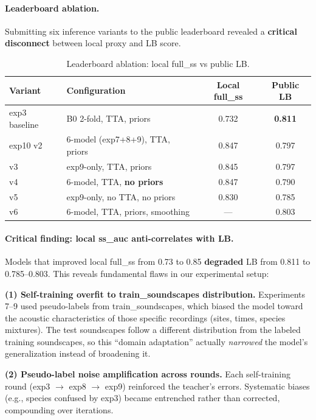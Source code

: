 \paragraph{Leaderboard ablation.}
Submitting six inference variants to the public leaderboard revealed a
\textbf{critical disconnect} between local proxy and LB score.

\begin{table}[h]
\centering
\caption{Leaderboard ablation: local full\_ss vs public LB.}
\label{tab:lb-ablation}
\begin{tabular}{llcc}
\hline
\textbf{Variant} & \textbf{Configuration} & \textbf{Local full\_ss} & \textbf{Public LB} \\
\hline
exp3 baseline     & B0 2-fold, TTA, priors            & 0.732 & \textbf{0.811} \\
exp10 v2          & 6-model (exp7+8+9), TTA, priors   & 0.847 & 0.797 \\
v3                & exp9-only, TTA, priors             & 0.845 & 0.797 \\
v4                & 6-model, TTA, \textbf{no priors}   & 0.847 & 0.790 \\
v5                & exp9-only, no TTA, no priors        & 0.830 & 0.785 \\
v6                & 6-model, TTA, priors, smoothing     & ---   & 0.803 \\
\hline
\end{tabular}
\end{table}

\paragraph{Critical finding: local ss\_auc anti-correlates with LB.}
Models that improved local full\_ss from 0.73 to 0.85 \textbf{degraded} LB from
0.811 to 0.785--0.803. This reveals fundamental flaws in our experimental setup:

\textbf{(1) Self-training overfit to train\_soundscapes distribution.}
Experiments 7--9 used pseudo-labels from train\_soundscapes, which biased the
model toward the acoustic characteristics of those specific recordings (sites,
times, species mixtures). The test soundscapes follow a different distribution
from the labeled training soundscapes, so this ``domain adaptation'' actually
\emph{narrowed} the model's generalization instead of broadening it.

\textbf{(2) Pseudo-label noise amplification across rounds.}
Each self-training round (exp3 $\to$ exp8 $\to$ exp9) reinforced the teacher's
errors. Systematic biases (e.g., species confused by exp3) became entrenched
rather than corrected, compounding over iterations.

